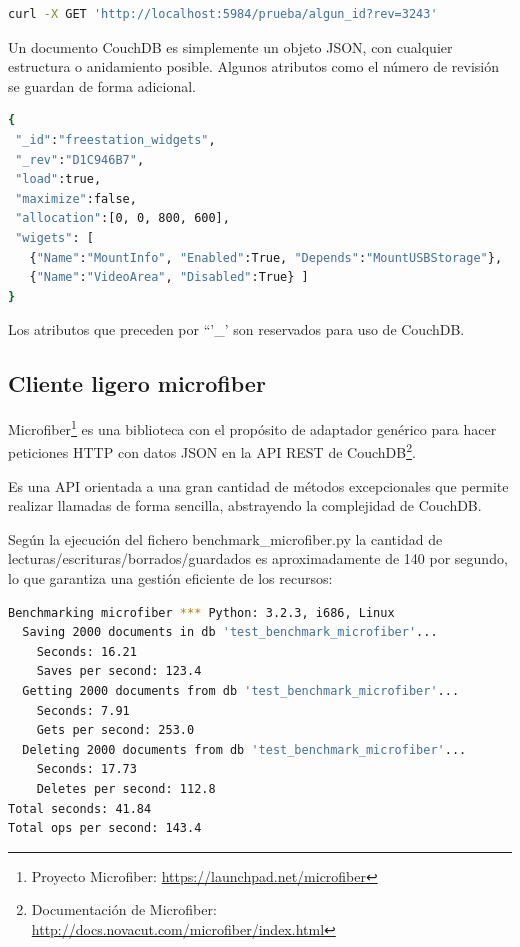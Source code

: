 \begin{lstlisting}[language={bash}, texcl=false, caption={Petición HTTP}]
curl -X GET 'http://localhost:5984/prueba/algun_id?rev=3243'
\end{lstlisting}

Un documento CouchDB es simplemente un objeto JSON, con cualquier estructura o
anidamiento posible. Algunos atributos como el número de revisión se guardan de
forma adicional.

\begin{lstlisting}[language={bash}, texcl=false, caption={Ejemplo Documento
CouchDB}]
{
 "_id":"freestation_widgets",
 "_rev":"D1C946B7",
 "load":true,
 "maximize":false,
 "allocation":[0, 0, 800, 600],
 "wigets": [
   {"Name":"MountInfo", "Enabled":True, "Depends":"MountUSBStorage"},
   {"Name":"VideoArea", "Disabled":True} ]
}
\end{lstlisting}

Los atributos que preceden por ``'\_' son reservados para uso de CouchDB.

\subsection{Cliente ligero microfiber}

Microfiber\footnote{Proyecto Microfiber:
\url{https://launchpad.net/microfiber}} es una biblioteca con el propósito de adaptador genérico para hacer
peticiones HTTP con datos JSON en la API REST de CouchDB\footnote{Documentación de Microfiber:
\url{http://docs.novacut.com/microfiber/index.html}}.

Es una API orientada a una gran cantidad de métodos excepcionales que permite
realizar llamadas de forma sencilla, abstrayendo la complejidad de CouchDB.

Según la ejecución del fichero benchmark\_microfiber.py la cantidad de
lecturas/escrituras/borrados/guardados es aproximadamente de 140 por segundo, lo
que garantiza una gestión eficiente de los recursos:

\begin{lstlisting}[language={bash}, texcl=false, caption={Benchmark Microfiber}]
Benchmarking microfiber *** Python: 3.2.3, i686, Linux
  Saving 2000 documents in db 'test_benchmark_microfiber'...
    Seconds: 16.21
    Saves per second: 123.4
  Getting 2000 documents from db 'test_benchmark_microfiber'...
    Seconds: 7.91
    Gets per second: 253.0
  Deleting 2000 documents from db 'test_benchmark_microfiber'...
    Seconds: 17.73
    Deletes per second: 112.8
Total seconds: 41.84
Total ops per second: 143.4
\end{lstlisting}


